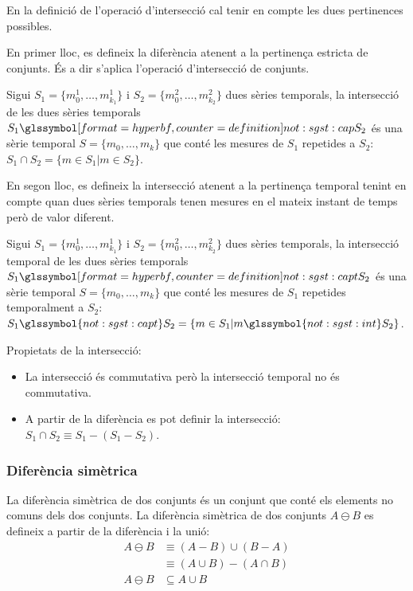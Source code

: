 En la definició de l'operació d'intersecció cal tenir en compte les
dues pertinences possibles.

En primer lloc, es defineix la diferència atenent a la pertinença
estricta de conjunts. És a dir s'aplica l'operació d'intersecció de
conjunts.
\begin{definition}[intersecció]
  Sigui $S_1=\{m_0^1, \dotsc, m_{k_1}^1\}$ i $S_2=\{m_0^2, \dotsc,
  m_{k_2}^2\}$ dues sèries temporals, la intersecció de les dues
  sèries temporals $S_1 \glssymboldef{not:sgst:cap} S_2$ és una sèrie
  temporal $S=\{m_0, \dotsc, m_k\}$ que conté les mesures de $S_1$
  repetides a $S_2$: $S_1 \cap S_2 = \{ m \in S_1 | m \in S_2 \}$.
\end{definition}

En segon lloc, es defineix la intersecció atenent a la pertinença
temporal tenint en compte quan dues sèries temporals tenen mesures en
el mateix instant de temps però de valor diferent.
\begin{definition}
  Sigui $S_1=\{m_0^1, \dotsc, m_{k_1}^1\}$ i $S_2=\{m_0^2, \dotsc,
  m_{k_2}^2\}$ dues sèries temporals, la intersecció temporal de les
  dues sèries temporals $S_1 \glssymboldef{not:sgst:capt} S_2$ és una
  sèrie temporal $S=\{m_0, \dotsc, m_k\}$ que conté les mesures de
  $S_1$ repetides temporalment a $S_2$: $S_1 \glssymbol{not:sgst:capt}
  S_2 = \{ m \in S_1 | m \glssymbol{not:sgst:int} S_2 \}$.
\end{definition}

Propietats de la intersecció:
\begin{itemize}
\item La intersecció és commutativa però la intersecció temporal no és
  commutativa.
\item A partir de la diferència es pot definir la intersecció: $S_1
  \cap S_2 \equiv S_1 - (S_1 - S_2)$.
\end{itemize}


\subsubsection{Diferència simètrica}

La diferència simètrica de dos conjunts és un conjunt que conté els
elements no comuns dels dos conjunts. La diferència simètrica de dos
conjunts $A \ominus B$ es defineix a partir de la diferència i la
unió:
\begin{align*}
A \ominus B  & \equiv (A-B)\cup(B-A)\\
             & \equiv (A\cup B)-(A\cap B)  \\
A \ominus B  & \subseteq A\cup B
\end{align*}

